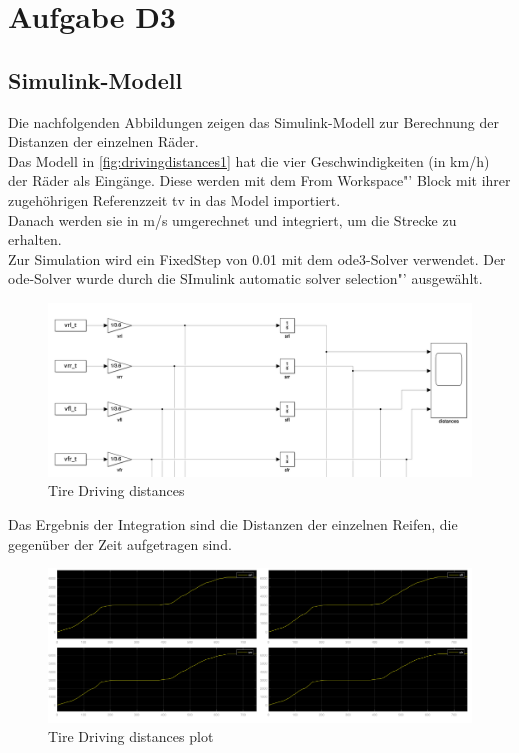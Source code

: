 
\chapter{Aufgabe D3}

\section{Simulink-Modell}
Die nachfolgenden Abbildungen zeigen das Simulink-Modell zur Berechnung der Distanzen der einzelnen Räder.\\
Das Modell in \autoref{fig:drivingdistances1} hat die vier Geschwindigkeiten (in km/h) der Räder als Eingänge. Diese werden mit dem \glqq From Workspace"' Block mit ihrer zugehöhrigen Referenzzeit tv in das Model importiert.\\
Danach werden sie in m/s umgerechnet und integriert, um die Strecke zu erhalten. \\
Zur Simulation wird ein FixedStep von 0.01 mit dem ode3-Solver verwendet. Der ode-Solver wurde durch die SImulink \glqq automatic solver selection"' ausgewählt.
\begin{figure}[h!]
	\centering
	\includegraphics[width=1\linewidth]{../Graphiken/DrivingDistances1}
	\caption{Tire Driving distances}
	\label{fig:drivingdistances1}
\end{figure}
Das Ergebnis der Integration sind die Distanzen der einzelnen Reifen, die gegenüber der Zeit aufgetragen sind.\newpage
\begin{figure}[h!]
	\centering
	\includegraphics[width=1\linewidth]{../Graphiken/DrivingDistances}
	\caption{Tire Driving distances plot}
	\label{fig:drivingdistances}
\end{figure}




	
	

	
	
	
	